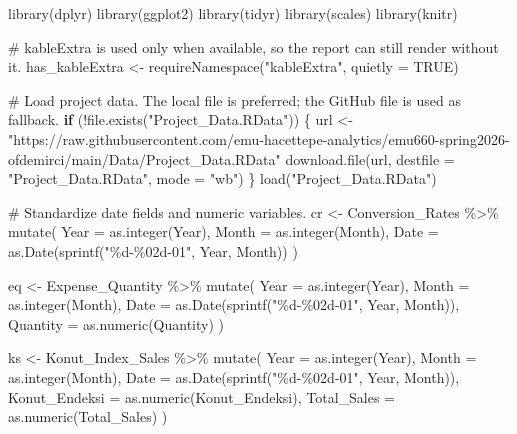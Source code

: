 \documentclass[
  11pt,
  a4paper,
  DIV=11,
  numbers=noendperiod]{scrartcl}
\newenvironment{Shaded}{\begin{snugshade}}{\end{snugshade}}
\newcommand{\AttributeTok}[1]{\textcolor[rgb]{0.40,0.45,0.13}{#1}}
\newcommand{\CommentTok}[1]{\textcolor[rgb]{0.37,0.37,0.37}{#1}}
\newcommand{\ConstantTok}[1]{\textcolor[rgb]{0.56,0.35,0.01}{#1}}
\newcommand{\ControlFlowTok}[1]{\textcolor[rgb]{0.00,0.23,0.31}{\textbf{#1}}}
\newcommand{\FunctionTok}[1]{\textcolor[rgb]{0.28,0.35,0.67}{#1}}
\newcommand{\NormalTok}[1]{\textcolor[rgb]{0.00,0.23,0.31}{#1}}
\newcommand{\OtherTok}[1]{\textcolor[rgb]{0.00,0.23,0.31}{#1}}
\newcommand{\SpecialCharTok}[1]{\textcolor[rgb]{0.37,0.37,0.37}{#1}}
\newcommand{\StringTok}[1]{\textcolor[rgb]{0.13,0.47,0.30}{#1}}
\begin{document}
\begin{Shaded}
\begin{Highlighting}[]
\FunctionTok{library}\NormalTok{(dplyr)}
\FunctionTok{library}\NormalTok{(ggplot2)}
\FunctionTok{library}\NormalTok{(tidyr)}
\FunctionTok{library}\NormalTok{(scales)}
\FunctionTok{library}\NormalTok{(knitr)}

\CommentTok{\# kableExtra is used only when available, so the report can still render without it.}
\NormalTok{has\_kableExtra }\OtherTok{\textless{}{-}} \FunctionTok{requireNamespace}\NormalTok{(}\StringTok{"kableExtra"}\NormalTok{, }\AttributeTok{quietly =} \ConstantTok{TRUE}\NormalTok{)}

\CommentTok{\# Load project data. The local file is preferred; the GitHub file is used as fallback.}
\ControlFlowTok{if}\NormalTok{ (}\SpecialCharTok{!}\FunctionTok{file.exists}\NormalTok{(}\StringTok{"Project\_Data.RData"}\NormalTok{)) \{}
\NormalTok{  url }\OtherTok{\textless{}{-}} \StringTok{"https://raw.githubusercontent.com/emu{-}hacettepe{-}analytics/emu660{-}spring2026{-}ofdemirci/main/Data/Project\_Data.RData"}
  \FunctionTok{download.file}\NormalTok{(url, }\AttributeTok{destfile =} \StringTok{"Project\_Data.RData"}\NormalTok{, }\AttributeTok{mode =} \StringTok{"wb"}\NormalTok{)}
\NormalTok{\}}
\FunctionTok{load}\NormalTok{(}\StringTok{"Project\_Data.RData"}\NormalTok{)}

\CommentTok{\# Standardize date fields and numeric variables.}
\NormalTok{cr }\OtherTok{\textless{}{-}}\NormalTok{ Conversion\_Rates }\SpecialCharTok{\%\textgreater{}\%}
  \FunctionTok{mutate}\NormalTok{(}
    \AttributeTok{Year =} \FunctionTok{as.integer}\NormalTok{(Year),}
    \AttributeTok{Month =} \FunctionTok{as.integer}\NormalTok{(Month),}
    \AttributeTok{Date =} \FunctionTok{as.Date}\NormalTok{(}\FunctionTok{sprintf}\NormalTok{(}\StringTok{"\%d{-}\%02d{-}01"}\NormalTok{, Year, Month))}
\NormalTok{  )}

\NormalTok{eq }\OtherTok{\textless{}{-}}\NormalTok{ Expense\_Quantity }\SpecialCharTok{\%\textgreater{}\%}
  \FunctionTok{mutate}\NormalTok{(}
    \AttributeTok{Year =} \FunctionTok{as.integer}\NormalTok{(Year),}
    \AttributeTok{Month =} \FunctionTok{as.integer}\NormalTok{(Month),}
    \AttributeTok{Date =} \FunctionTok{as.Date}\NormalTok{(}\FunctionTok{sprintf}\NormalTok{(}\StringTok{"\%d{-}\%02d{-}01"}\NormalTok{, Year, Month)),}
    \AttributeTok{Quantity =} \FunctionTok{as.numeric}\NormalTok{(Quantity)}
\NormalTok{  )}

\NormalTok{ks }\OtherTok{\textless{}{-}}\NormalTok{ Konut\_Index\_Sales }\SpecialCharTok{\%\textgreater{}\%}
  \FunctionTok{mutate}\NormalTok{(}
    \AttributeTok{Year =} \FunctionTok{as.integer}\NormalTok{(Year),}
    \AttributeTok{Month =} \FunctionTok{as.integer}\NormalTok{(Month),}
    \AttributeTok{Date =} \FunctionTok{as.Date}\NormalTok{(}\FunctionTok{sprintf}\NormalTok{(}\StringTok{"\%d{-}\%02d{-}01"}\NormalTok{, Year, Month)),}
    \AttributeTok{Konut\_Endeksi =} \FunctionTok{as.numeric}\NormalTok{(Konut\_Endeksi),}
    \AttributeTok{Total\_Sales =} \FunctionTok{as.numeric}\NormalTok{(Total\_Sales)}
\NormalTok{  )}


\end{Highlighting}
\end{Shaded}
\end{document}

